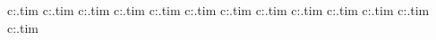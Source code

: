 c:\wipeout\textures\ship.tim
c:\wipeout\textures\transtrk.tim
c:\wipeout\textures\bug.tim
c:\wipeout\textures\skyonoff.tim
c:\wipeout\textures\lndonoff.tim
c:\wipeout\textures\save.tim
c:\wipeout\textures\vram.tim
c:\wipeout\textures\camera.tim
c:\wipeout\textures\chngtrk.tim
c:\wipeout\textures\dpa.tim
c:\wipeout\textures\radius.tim
c:\wipeout\textures\trakview.tim
c:\wipeout\textures\empty.tim
